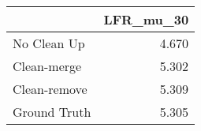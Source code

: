 \begin{tabular}{lr}
\toprule
{} & LFR_mu_30 \\
\midrule
No Clean Up  &     4.670 \\
Clean-merge  &     5.302 \\
Clean-remove &     5.309 \\
Ground Truth &     5.305 \\
\bottomrule
\end{tabular}
